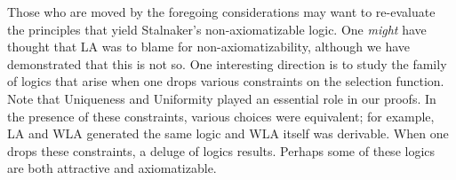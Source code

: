 \documentclass[12pt]{article}
\begin{document}
Those who are moved by the foregoing considerations may want to re-evaluate the principles that yield Stalnaker's non-axiomatizable logic. One \emph{might} have thought that LA was to blame for non-axiomatizability, although we have demonstrated that this is not so. One interesting direction is to study the family of logics that arise when one drops various constraints on the selection function. Note that Uniqueness and Uniformity played an essential role in our proofs. In the presence of these constraints, various choices were equivalent; for example, LA and WLA generated the same logic and WLA itself was derivable. When one drops these constraints, a deluge of logics results. Perhaps some of these logics are both attractive and axiomatizable.



\end{document}
